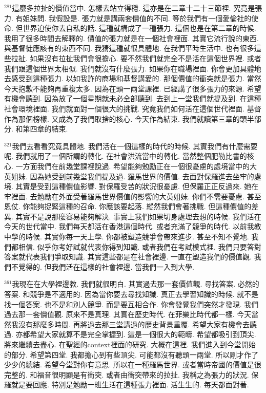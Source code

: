 \documentclass{book}
\begin{document}
$^{281}$這麼多拉扯的價值當中.
怎樣去站立得穩.
這亦是在二章十二十三節裡.
究竟是張力.
有姐妹問.
我假設是.
張力就是講兩套價值的不同.
等於我們有一個愛倫社的使命.
但世界迫使你去自私的話.
這種就構成了一種張力.
這個也是在第二章的時候.
我用了很多時間去解釋的.
價值的張力就是在一個社會裡面.
其實它流行說的東西.
與基督徒應該有的東西不同.
我猜這種就很具體地.
在我們平時生活中.
也有很多這些拉扯.
如果沒有拉扯我們會很擔心.
要不然我們就完全不是活在這個世界裡.
或者我們跟這個世界太相似.
我們就沒有什麼張力.
如果你在職場裡面.
你會更加具體地去感受到這種張力.
以如我詐的商場和基督講愛的.
那個價值的衝突就是張力.
當然今天抱歉不能夠再重複太多.
因為在頭一兩堂課裡.
已經講了很多張力的來源.
希望有機會聽到.
因為放了一個星期就未必全部聽到.
去到上一堂我們就提及到.
在這種社會環境裡面.
我們就面對一個很大的挑戰.
究竟我們如何活在這個世代裡面.
基督作為那個榜樣.
又成為了我們取捨的核心.
今天作為結束.
我們就讀第三章的頭半部分.
和第四章的結束.

$^{321}$我們去看看究竟具體地.
我們活在一個這樣的時代的時候.
其實我們有什麼需要呢.
我們就用了一個所謂的轉化.
在社會洪流當中的轉化.
當然整個肥勒比書的核心.
一方面我們在前幾堂課裡說過.
希望能夠勉勵正在一個很憂慮的處境當中的大英姐妹.
因為她受到前幾堂我們提及過.
羅馬世界的價值.
去面對保羅進去坐牢的處境.
其實是受到這種價值影響.
對保羅受苦的狀況很憂慮.
但保羅正正反過來.
她在牢裡面.
去勉勵在外面受著羅馬世界價值的影響的大英姐妹.
你們不需要憂慮.
甚至恩仗.
你能夠捉緊這種的召命.
你應該要起落.
縱然我們會著挑戰.
但這種價值的差異.
其實不是說那麼容易能夠解決.
事實上我們如果切身處理去想的時候.
我們活在今天的世代當中.
我們每天都活在香港這個時代.
或者充滿了競爭的時代.
以前我教中學的時候.
其實你每一天上學.
你都被塑造競爭會帶來進步.
甚至不知不覺地.
我們都相信.
似乎你考好試就代表你得到知識.
或者我們在考試模式裡.
我們只要答對答案就代表我們爭取知識.
其實這些都是在社會裡邊.
一直在塑造我們的價值觀.
我們不覺得的.
但我們活在這樣的社會裡邊.
當我們一入到大學.

$^{361}$我現在在大學裡邊教.
我們就很明白.
其實過去那一套價值觀.
尋找答案.
必然的答案.
和競爭是不適用的.
因為當你要去尋找知識.
真正去學習知識的時候.
就不是找一個答案.
也不是和別人競爭.
而是要互相合作.
你會發覺我們突然才發現.
我們過去那一套價值觀.
原來不是真理.
其實在歷史時代.
在菲樂比時代都一樣.
今天當然我沒有那麼多時間.
再將過去那三堂講過的歷史背景重覆.
希望大家有機會去聽過.
亦都希望大家就算不是完全掌握到.
這是一個很大的範疇.
希望都吸引到頂尖.
將來繼續去盡心.
在聖經的context裡面的研究.
大概在這裡.
我們進入到今堂開始的部分.
希望第四堂.
我都擔心到有些頂尖.
可能都沒有聽頭一兩堂.
所以剛才作了少少的總結.
希望今堂對你有意思.
所以在一種羅馬世界.
或者當時帝國的價值是很完整的.
和福音很明顯是有衝突.
或者由衝突帶來的拉扯.
我稱之為張力的狀況.
保羅就是要回應.
特別是勉勵一班生活在這種張力裡面.
活生生的.
每天都面對著.
\end{document}
